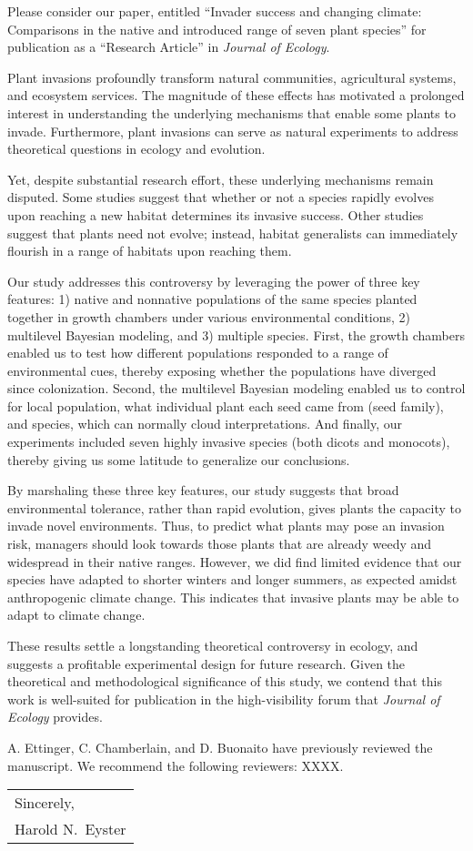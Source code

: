 \documentclass{article}
\begin{document}
	\medskip
	Please consider our paper, entitled “Invader success and changing climate: Comparisons in the native and introduced range of seven plant species” for
publication as a “Research Article” in \textit{Journal of Ecology}. \par
	Plant invasions profoundly transform natural communities, agricultural systems, and ecosystem services. The magnitude of these effects has motivated a prolonged interest in understanding the underlying mechanisms that enable some plants to invade. Furthermore, plant invasions can serve as natural experiments to address theoretical questions in ecology and evolution.  \par 
	Yet, despite substantial research effort, these underlying mechanisms remain disputed. Some studies suggest that whether or not a species rapidly evolves upon reaching a new habitat determines its invasive success. Other studies suggest that plants need not evolve; instead, habitat generalists can immediately flourish in a range of habitats upon reaching them.\par 
	Our study addresses this controversy by leveraging the power of three key features: 1) native and nonnative populations of the same species planted together in growth chambers under various environmental conditions, 2) multilevel Bayesian modeling, and 3) multiple species. First, the growth chambers enabled us to test how different populations responded to a range of environmental cues, thereby exposing whether the populations have diverged since colonization. Second, the multilevel Bayesian modeling enabled us to control for local population, what individual plant each seed came from (seed family), and species, which can normally cloud interpretations. And finally, our experiments included seven highly invasive species (both dicots and monocots), thereby giving us some latitude to generalize our conclusions. \par 
	By marshaling these three key features, our study suggests that broad environmental tolerance, rather than rapid evolution, gives plants the capacity to invade novel environments. Thus, to predict what plants may pose an invasion risk, managers should look towards those plants that are already weedy and widespread in their native ranges. However, we did find limited evidence that our species have adapted to shorter winters and longer summers, as expected amidst anthropogenic climate change. This indicates that invasive plants may be able to adapt to climate change. 
	
	These results settle a longstanding theoretical controversy in ecology, and suggests a profitable experimental design for future research. Given the theoretical and methodological significance of this study, we contend that this work is well-suited for publication in the high-visibility forum that \textit{Journal of Ecology} provides. \par 
A. Ettinger, C. Chamberlain, and D. Buonaito have previously reviewed the manuscript. We recommend the
following reviewers: XXXX. 
	\bigskip
	
	\null\hfill
	\begin{tabular}{l@{}}
		Sincerely, \\[5\normalbaselineskip]
		Harold N.\ Eyster
	\end{tabular}
	
\end{document}
